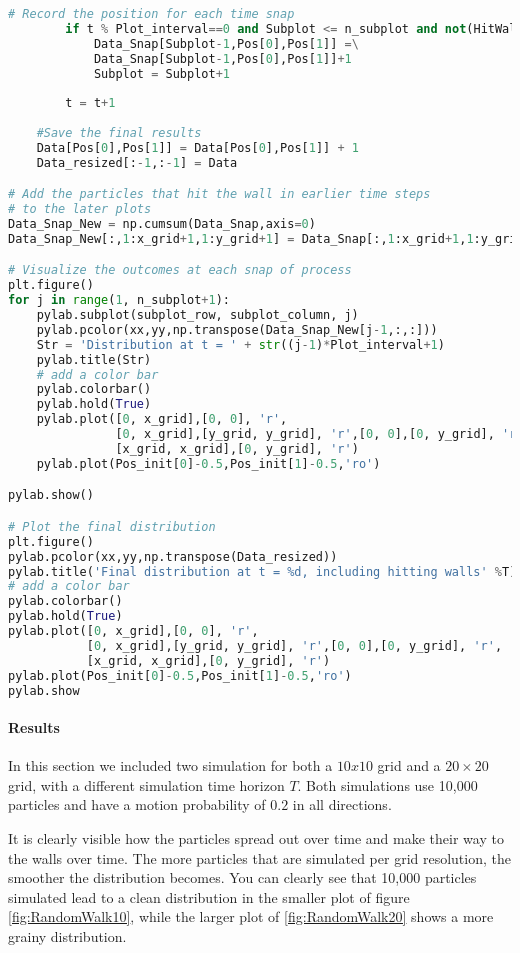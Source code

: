\begin{lstlisting}[language = python, caption = 2D Ramdom Walk Simulation]
        # Record the position for each time snap
        if t % Plot_interval==0 and Subplot <= n_subplot and not(HitWall):        
            Data_Snap[Subplot-1,Pos[0],Pos[1]] =\
            Data_Snap[Subplot-1,Pos[0],Pos[1]]+1
            Subplot = Subplot+1        
        
        t = t+1
    
    #Save the final results
    Data[Pos[0],Pos[1]] = Data[Pos[0],Pos[1]] + 1
    Data_resized[:-1,:-1] = Data       

# Add the particles that hit the wall in earlier time steps
# to the later plots
Data_Snap_New = np.cumsum(Data_Snap,axis=0)
Data_Snap_New[:,1:x_grid+1,1:y_grid+1] = Data_Snap[:,1:x_grid+1,1:y_grid+1]

# Visualize the outcomes at each snap of process
plt.figure()
for j in range(1, n_subplot+1):
    pylab.subplot(subplot_row, subplot_column, j)
    pylab.pcolor(xx,yy,np.transpose(Data_Snap_New[j-1,:,:]))
    Str = 'Distribution at t = ' + str((j-1)*Plot_interval+1)
    pylab.title(Str)
    # add a color bar
    pylab.colorbar()
    pylab.hold(True)
    pylab.plot([0, x_grid],[0, 0], 'r',
               [0, x_grid],[y_grid, y_grid], 'r',[0, 0],[0, y_grid], 'r',
               [x_grid, x_grid],[0, y_grid], 'r')
    pylab.plot(Pos_init[0]-0.5,Pos_init[1]-0.5,'ro')

pylab.show()

# Plot the final distribution
plt.figure()
pylab.pcolor(xx,yy,np.transpose(Data_resized))
pylab.title('Final distribution at t = %d, including hitting walls' %T)
# add a color bar 
pylab.colorbar()
pylab.hold(True)
pylab.plot([0, x_grid],[0, 0], 'r',
           [0, x_grid],[y_grid, y_grid], 'r',[0, 0],[0, y_grid], 'r',
           [x_grid, x_grid],[0, y_grid], 'r')
pylab.plot(Pos_init[0]-0.5,Pos_init[1]-0.5,'ro')
pylab.show
\end{lstlisting}



\paragraph{Results}
In this section we included two simulation for both a $10x10$ grid and a $20 \times 20$ grid, with a different simulation time horizon $T$. Both simulations use 10,000 particles and have a motion probability of $0.2$ in all directions. \newline

It is clearly visible how the particles spread out over time and make their way to the walls over time. The more particles that are simulated per grid resolution, the smoother the distribution becomes. You can clearly see that 10,000 particles simulated lead to a clean distribution in the smaller plot of figure \ref{fig:RandomWalk10}, while the larger plot of \ref{fig:RandomWalk20} shows a more grainy distribution.

